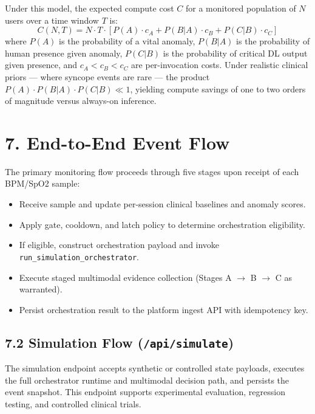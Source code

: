 \documentclass[11pt,a4paper]{article}
\begin{document}
Under this model, the expected compute cost $C$ for a monitored population of $N$ users over a time window $T$ is:
\begin{equation}
 C(N, T) = N \cdot T \cdot [P(A) \cdot c_A + P(B|A) \cdot c_B + P(C|B) \cdot c_C]
\end{equation}
where $P(A)$ is the probability of a vital anomaly, $P(B|A)$ is the probability of human presence given anomaly, $P(C|B)$ is the probability of critical DL output given presence, and $c_A < c_B < c_C$ are per-invocation costs. Under realistic clinical priors — where syncope events are rare — the product $P(A)\cdot P(B|A)\cdot P(C|B) \ll 1$, yielding compute savings of one to two orders of magnitude versus always-on inference.

\section{7. End-to-End Event Flow}
The primary monitoring flow proceeds through five stages upon receipt of each BPM/SpO2 sample:
\begin{itemize}[leftmargin=1.4em]
  \item Receive sample and update per-session clinical baselines and anomaly scores.
  \item Apply gate, cooldown, and latch policy to determine orchestration eligibility.
  \item If eligible, construct orchestration payload and invoke \texttt{run\_simulation\_orchestrator}.
  \item Execute staged multimodal evidence collection (Stages A $\rightarrow$ B $\rightarrow$ C as warranted).
  \item Persist orchestration result to the platform ingest API with idempotency key.
\end{itemize}

\subsection{7.2 Simulation Flow (\texttt{/api/simulate})}
The simulation endpoint accepts synthetic or controlled state payloads, executes the full orchestrator runtime and multimodal decision path, and persists the event snapshot. This endpoint supports experimental evaluation, regression testing, and controlled clinical trials.
\end{document}
